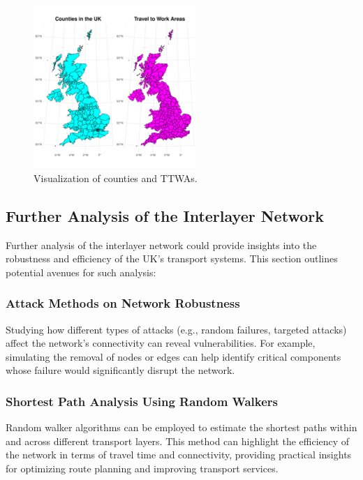 \begin{figure}[H]
    \centering
    \includegraphics[width=0.55\textwidth]{images/ttwasandcounties.pdf}
    \caption{Visualization of counties and TTWAs.}
\end{figure}

\subsection*{Further Analysis of the Interlayer Network}
Further analysis of the interlayer network could provide insights into the robustness and efficiency of the UK's transport systems. This section outlines potential avenues for such analysis:

\subsubsection*{Attack Methods on Network Robustness}
Studying how different types of attacks (e.g., random failures, targeted attacks) affect the network's connectivity can reveal vulnerabilities. For example, simulating the removal of nodes or edges can help identify critical components whose failure would significantly disrupt the network.

\subsubsection*{Shortest Path Analysis Using Random Walkers}
Random walker algorithms can be employed to estimate the shortest paths within and across different transport layers. This method can highlight the efficiency of the network in terms of travel time and connectivity, providing practical insights for optimizing route planning and improving transport services.

